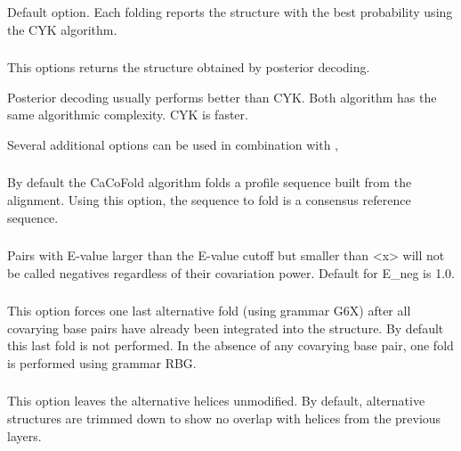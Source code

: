 \subsubsection{}        Default option. Each folding reports the structure with the best probability using the CYK algorithm.

\subsubsection{}   This options returns the structure obtained by posterior decoding.

\noindent
Posterior decoding usually performs better than CYK. Both algorithm has the same algorithmic complexity. CYK is faster.

\noindent
Several additional options can be used in combination with   ,

\subsubsection{}   By default the CaCoFold algorithm folds a profile sequence built from the alignment. Using this option, the sequence to fold is a consensus reference sequence.

\subsubsection{}   Pairs with E-value larger than the E-value cutoff but smaller than <x> will not be called negatives regardless of their covariation power. Default for E\_neg is 1.0.

\subsubsection{} This option forces one last alternative fold (using grammar G6X) after all covarying base pairs have already been
integrated into the structure. By default this last fold is not
performed. In the absence of any covarying base pair, one fold is
performed using grammar RBG.

\subsubsection{} This option leaves the alternative helices unmodified. By default, alternative structures are trimmed down to show no overlap with helices from the previous layers.


